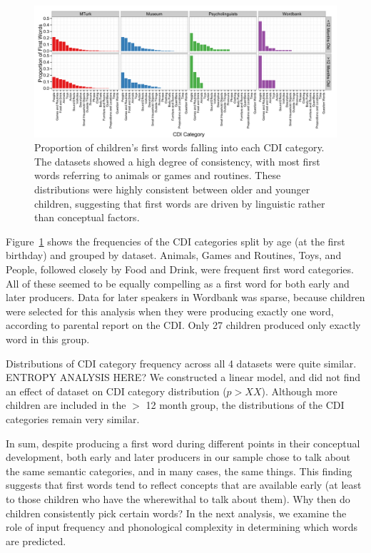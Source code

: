 \documentclass[10pt,letterpaper]{article}
\begin{document}
\begin{figure}[]
\begin{center}
\includegraphics[scale = .6]{figures/cdicats_4sets.pdf}
\end{center}
\caption{Proportion of children's first words falling into each CDI category. The datasets showed a high degree of consistency, with most first words referring to animals or games and routines. These distributions were highly consistent between older and younger children, suggesting that first words are driven by linguistic rather than conceptual factors.}
\label{fig:cdi_cats}
\end{figure}

Figure~\ref{fig:cdi_cats} shows the frequencies of the CDI categories split by age (at the first birthday) and grouped by dataset. Animals, Games and Routines, Toys, and People, followed closely by Food and Drink, were frequent first word categories. All of these seemed to be equally compelling as a first word for both early and later producers. Data for later speakers in Wordbank was sparse, because children were selected for this analysis when they were producing exactly one word, according to parental report on the CDI. Only 27 children produced only exactly word in this group.

Distributions of CDI category frequency across all 4 datasets were quite similar. ENTROPY ANALYSIS HERE? We constructed a linear model, and did not find an effect of dataset on CDI category distribution ($p > XX$). Although more children are included in the $>$ 12 month group, the distributions of the CDI categories remain very similar.

In sum, despite producing a first word during different points in their conceptual development, both early and later producers in our sample chose to talk about the same semantic categories, and in many cases, the same things. This finding suggests that first words tend to reflect concepts that are available early (at least to those children who have the wherewithal to talk about them). Why then do children consistently pick certain words? In the next analysis, we examine the role of input frequency and phonological complexity in determining which words are predicted. 
\end{document}
